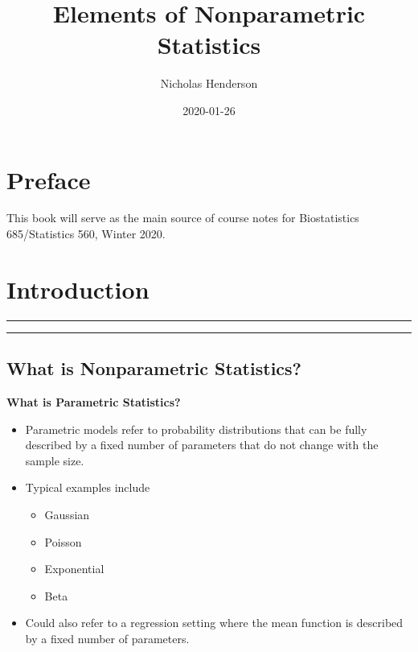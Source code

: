 \documentclass[]{book}
\title{Elements of Nonparametric Statistics}
\author{Nicholas Henderson}
\date{2020-01-26}
\providecommand{\tightlist}{%
  \setlength{\itemsep}{0pt}\setlength{\parskip}{0pt}}
\begin{document}
\maketitle

{
\setcounter{tocdepth}{1}
\tableofcontents
}
\hypertarget{preface}{%
\chapter*{Preface}\label{preface}}

This book will serve as the main source of course notes for Biostatistics 685/Statistics 560, Winter 2020.

\hypertarget{intro}{%
\chapter{Introduction}\label{intro}}

\begin{center}\rule{0.5\linewidth}{\linethickness}\end{center}

\begin{center}\rule{0.5\linewidth}{\linethickness}\end{center}

\hypertarget{sec:whatisnonpar}{%
\section{What is Nonparametric Statistics?}\label{sec:whatisnonpar}}

\textbf{What is Parametric Statistics?}

\begin{itemize}
\item
  Parametric models refer to probability distributions that can
  be fully described by a fixed number of parameters that do not change
  with the sample size.
\item
  Typical examples include

  \begin{itemize}
  \tightlist
  \item
    Gaussian
  \item
    Poisson
  \item
    Exponential
  \item
    Beta
  \end{itemize}
\item
  Could also refer to a regression setting where the mean function
  is described by a fixed number of parameters.
\end{itemize}
\end{document}
